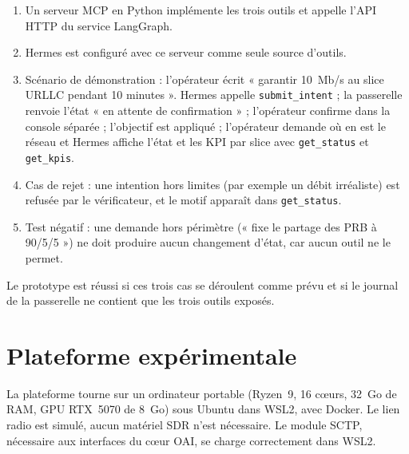 \documentclass[11pt,a4paper]{article}
\newcommand{\tool}[1]{\texttt{#1}}
\begin{document}
\begin{enumerate}
  \item Un serveur MCP en Python implémente les trois outils et appelle l'API HTTP du service LangGraph.
  \item Hermes est configuré avec ce serveur comme seule source d'outils.
  \item Scénario de démonstration : l'opérateur écrit « garantir 10~Mb/s au slice URLLC
        pendant 10 minutes ». Hermes appelle \tool{submit\_intent} ; la passerelle renvoie
        l'état « en attente de confirmation » ; l'opérateur confirme dans la console
        séparée ; l'objectif est appliqué ; l'opérateur demande où en est le réseau et Hermes
        affiche l'état et les KPI par slice avec \tool{get\_status} et \tool{get\_kpis}.
  \item Cas de rejet : une intention hors limites (par exemple un débit irréaliste) est
        refusée par le vérificateur, et le motif apparaît dans \tool{get\_status}.
  \item Test négatif : une demande hors périmètre (« fixe le partage des PRB à 90/5/5 »)
        ne doit produire aucun changement d'état, car aucun outil ne le permet.
\end{enumerate}

Le prototype est réussi si ces trois cas se déroulent comme prévu et si le journal de la
passerelle ne contient que les trois outils exposés.

\section{Plateforme expérimentale}

La plateforme tourne sur un ordinateur portable (Ryzen~9, 16 c\oe urs, 32~Go de RAM,
GPU RTX~5070 de 8~Go) sous Ubuntu dans WSL2, avec Docker. Le lien radio est simulé,
aucun matériel SDR n'est nécessaire. Le module SCTP, nécessaire aux interfaces du c\oe ur
OAI, se charge correctement dans WSL2.
\end{document}

